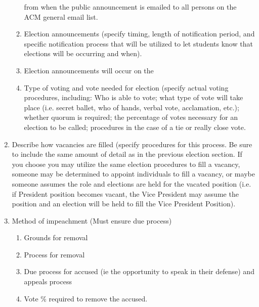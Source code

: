 \documentclass[11pt,a4paper,notitlepage]{article}
\begin{document}
\begin{enumerate}[label=\Alph*.]
\begin{enumerate}[label=\arabic*.]
      from when the public announcement is emailed to all persons on the ACM
      general email list.
      \item Election announcements (specify timing, length of notification
      period, and specific notification process that will be utilized to let
      students know that elections will be occurring and when).
      \item Election announcements will occur on the 
      \item Type of voting and vote needed for election (specify actual voting
      procedures, including:  Who is able to vote; what type of vote will take
      place (i.e. secret ballet, who of hands, verbal vote, acclamation, etc.);
      whether quorum is required; the percentage of votes necessary for an
      election to be called; procedures in the case of a tie or really close
      vote.
    \end{enumerate}
  \item Describe how vacancies are filled (specify procedures for this process.
  Be sure to include the same amount of detail as in the previous election
  section.  If you choose you may utilize the same election procedures to fill a
  vacancy, someone may be determined to appoint individuals to fill a vacancy,
  or maybe someone assumes the role and elections are held for the vacated
  position (i.e. if President position becomes vacant, the Vice President may
  assume the position and an election will be held to fill the Vice President
  Position).
  \item Method of impeachment (Must ensure due process)
    \begin{enumerate}[label=\arabic*.]
      \item Grounds for removal
      \item Process for removal
      \item Due process for accused (ie the opportunity to speak in their
      defense) and appeals process
      \item Vote \% required to remove the accused.
    \end{enumerate}
  \end{enumerate}
\end{document}
